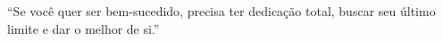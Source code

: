 ``Se você quer ser bem-sucedido, precisa ter dedicação total, buscar seu último limite e dar o melhor de si.''


